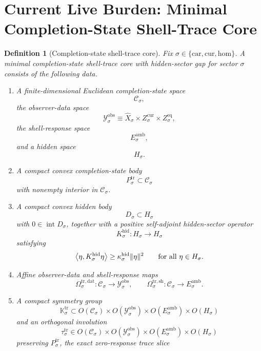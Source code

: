 \documentclass[11pt]{article}
\newcommand{\Car}{\mathrm{car}}
\newcommand{\Cur}{\mathrm{cur}}
\newcommand{\Hom}{\mathrm{hom}}
\newcommand{\VisibleAffine}[1]{\widehat X_{#1}}
\newcommand{\DataSpace}[1]{\mathcal Y_{#1}^{\mathrm{obs}}}
\newcommand{\AmbientTarget}[1]{E_{#1}^{\mathrm{amb}}}
\newcommand{\GapSpace}[1]{H_{#1}}
\newcommand{\GapBody}[1]{D_{#1}}
\newcommand{\HiddenOperator}[1]{K_{#1}^{\mathrm{hid}}}
\newcommand{\CoreState}[1]{\mathcal C_{#1}}
\newcommand{\TraceBody}[1]{P_{#1}^{\mathrm{tr}}}
\newcommand{\TraceDataMap}[1]{\Omega_{#1}^{\mathrm{tr,dat}}}
\newcommand{\TraceShellMap}[1]{\Omega_{#1}^{\mathrm{tr,sh}}}
\newcommand{\TraceSym}[1]{\mathbb K_{#1}^{\mathrm{tr}}}
\newcommand{\TraceTime}[1]{\tau_{#1}^{\mathrm{tr}}}
\newtheorem{definition}{Definition}
\begin{document}
\section{Current Live Burden: Minimal Completion-State Shell-Trace Core}

\begin{definition}[Completion-state shell-trace core]
\label{def:trace}
Fix \(\sigma\in\{\Car,\Cur,\Hom\}\). A \emph{minimal completion-state shell-trace core with hidden-sector gap} for sector \(\sigma\) consists of the following data.
\begin{enumerate}
    \item A finite-dimensional Euclidean completion-state space
    \[
    \CoreState{\sigma},
    \]
    the observer-data space
    \[
    \DataSpace{\sigma}
    \equiv
    \VisibleAffine{\sigma}\times Z_{\sigma}^{\mathrm{cur}}\times Z_{\sigma}^{\mathrm{eq}},
    \]
    the shell-response space
    \[
    \AmbientTarget{\sigma},
    \]
    and a hidden space
    \[
    \GapSpace{\sigma}.
    \]
    \item A compact convex completion-state body
    \[
    \TraceBody{\sigma}\subset\CoreState{\sigma}
    \]
    with nonempty interior in \(\CoreState{\sigma}\).
    \item A compact convex hidden body
    \[
    \GapBody{\sigma}\subset\GapSpace{\sigma}
    \]
    with \(0\in\operatorname{int}\GapBody{\sigma}\), together with a positive self-adjoint hidden-sector operator
    \[
    \HiddenOperator{\sigma}:\GapSpace{\sigma}\to\GapSpace{\sigma}
    \]
    satisfying
    \begin{equation}
    \ev{\eta,\HiddenOperator{\sigma}\eta}
    \ge
    \kappa_{\sigma}^{\mathrm{hid}}\|\eta\|^{2}
    \qquad
    \text{for all }\eta\in\GapSpace{\sigma}.
    \label{eq:tracegap}
    \end{equation}
    \item Affine observer-data and shell-response maps
    \[
    \TraceDataMap{\sigma}:\CoreState{\sigma}\to\DataSpace{\sigma},
    \qquad
    \TraceShellMap{\sigma}:\CoreState{\sigma}\to\AmbientTarget{\sigma}.
    \]
    \item A compact symmetry group
    \[
    \TraceSym{\sigma}\subset
    O(\CoreState{\sigma})\times
    O(\DataSpace{\sigma})\times
    O(\AmbientTarget{\sigma})\times
    O(\GapSpace{\sigma})
    \]
    and an orthogonal involution
    \[
    \TraceTime{\sigma}\in
    O(\CoreState{\sigma})\times
    O(\DataSpace{\sigma})\times
    O(\AmbientTarget{\sigma})\times
    O(\GapSpace{\sigma})
    \]
    preserving \(\TraceBody{\sigma}\), the exact zero-response trace slice

\end{enumerate}
\end{definition}
\end{document}
